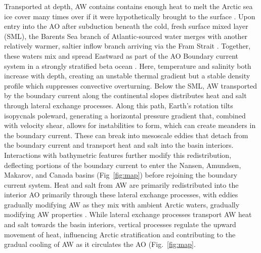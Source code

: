 \documentclass[draft]{agujournal2019}
\begin{document}
Transported at depth, AW contains contains enough heat to melt the Arctic sea ice cover many times over if it were hypothetically brought to the surface \cite{Polyakov2017,Stroeve2018,Grabon2021}. Upon entry into the AO after subduction beneath the cold, fresh surface mixed layer (SML), the Barents Sea branch of Atlantic-sourced water merges with another relatively warmer, saltier inflow branch arriving via the Fram Strait \cite{schauer1997,Lien_Trofimov_2013}. Together, these waters mix and spread Eastward as part of the AO Boundary current system in a strongly stratified beta ocean \cite{schauer1997,Wang2020,Rudels2022}. Here, temperature and salinity both increase with depth, creating an unstable thermal gradient but a stable density profile which suppresses convective overturning. Below the SML, AW transported by the boundary current along the continental slopes distributes heat and salt through lateral exchange processes. Along this path, Earth's rotation tilts isopycnals poleward, generating a horizontal pressure gradient that, combined with velocity shear, allows for instabilities to form, which can create meanders in the boundary current. These can break into mesoscale eddies that detach from the boundary current and transport heat and salt into the basin interiors. Interactions with bathymetric features further modify this redistribution, deflecting portions of the boundary current to enter the Nansen, Amundsen, Makarov, and Canada basins (Fig~\ref{fig:map}) before rejoining the boundary current system. Heat and salt from AW are primarily redistributed into the interior AO primarily through these lateral exchange processes, with eddies gradually modifying AW as they mix with ambient Arctic waters, gradually modifying AW properties \cite{Rudels2008,Rudels2022}. While lateral exchange processes transport AW heat and salt towards the basin interiors, vertical processes regulate the upward movement of heat, influencing Arctic stratification and contributing to the gradual cooling of AW as it circulates the AO (Fig.~\ref{fig:map}.
\end{document}
